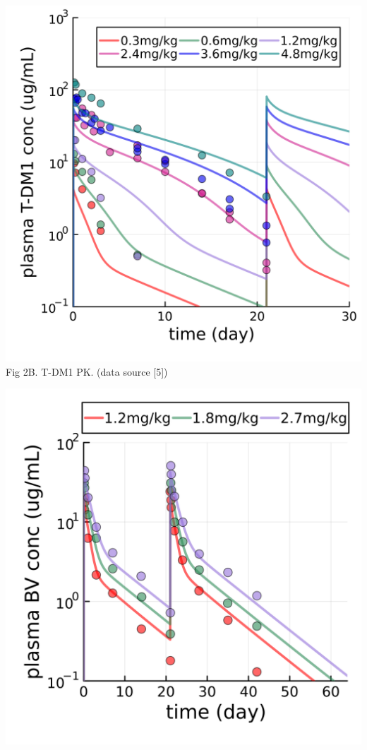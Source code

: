 \documentclass[portrait,fontscale=0.3,paperwidth=36in,paperheight=48in]{baposter}
\begin{document}
\begin{poster}
{\begin{minipage}[b]{0.24\linewidth}
\includegraphics[width=\textwidth]{../img/t-dm1-pk.png}
\scriptsize{Fig 2B. T-DM1 PK. (data source [5])}
\end{minipage}
\begin{minipage}[b]{0.24\linewidth}
\centering
\includegraphics[width=\textwidth]{../img/brentuximab-vedotin-pk.png}

\end{minipage}}
\end{poster}
\end{document}
